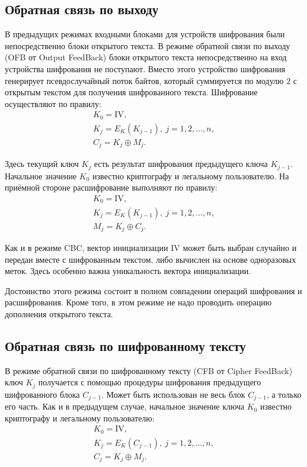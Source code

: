 \subsection{Обратная связь по выходу}

В предыдущих режимах входными блоками для устройств шифрования были непосредственно блоки открытого текста.
В режиме обратной связи по выходу (OFB от Output FeedBack) блоки открытого текста непосредственно на вход устройства шифрования не поступают. Вместо этого устройство шифрования генерирует псевдослучайный поток байтов, который суммируется по модулю $2$ с открытым текстом для получения шифрованного текста. Шифрование осуществляют по правилу:
\[ \begin{array}{l}
    K_0 = \textrm{IV}, \\
    K_j = E_K(K_{j-1}), ~ j = 1, 2, \dots, n, \\
    C_j = K_j \oplus M_j.
\end{array} \]

Здесь текущий ключ $K_j$ есть результат шифрования предыдущего ключа $K_{j-1}$. Начальное значение $K_0$ известно криптографу и легальному пользователю. На приёмной стороне расшифрование выполняют по правилу:
\[ \begin{array}{l}
    K_0 = \textrm{IV}, \\
    K_j = E_K(K_{j-1}), ~ j = 1, 2, \dots, n, \\
    M_j = K_j \oplus C_j.
\end{array} \]

Как и в режиме CBC, вектор инициализации $\textrm{IV}$ может быть выбран случайно и передан вместе с шифрованным текстом, либо вычислен на основе одноразовых меток. Здесь особенно важна уникальность вектора инициализации.

Достоинство этого режима состоит в полном совпадении операций шифрования и расшифрования. Кроме того, в этом режиме не надо проводить операцию дополнения открытого текста.


\subsection{Обратная связь по шифрованному тексту}

В режиме обратной связи по шифрованному тексту (CFB от Cipher FeedBack) ключ $K_j$ получается с помощью процедуры шифрования предыдущего шифрованного блока $C_{j-1}$. Может быть использован не весь блок $C_{j-1}$, а только его часть. Как и в предыдущем случае, начальное значение ключа $K_0$ известно криптографу и легальному пользователю:
\[ \begin{array}{l}
    K_0 = \textrm{IV}, \\
    K_j = E_K(C_{j-1}), ~ j = 1, 2, \dots, n,\\
    C_j = K_j \oplus M_j.
\end{array} \]

